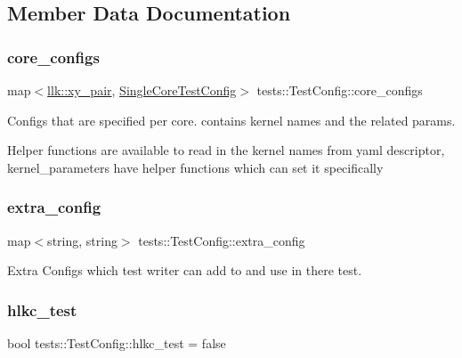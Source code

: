 \subsection{Member Data Documentation}
\mbox{\label{structtests_1_1TestConfig_ae5193ec96cb529d0e40360c46e4b6b42}} 
\subsubsection{\texorpdfstring{core\+\_\+configs}{core\_configs}}
{\footnotesize\ttfamily map$<$\hyperlink{structllk_1_1xy__pair}{llk\+::xy\+\_\+pair}, \hyperlink{structtests_1_1SingleCoreTestConfig}{Single\+Core\+Test\+Config}$>$ tests\+::\+Test\+Config\+::core\+\_\+configs}



Configs that are specified per core. contains kernel names and the related params. 

Helper functions are available to read in the kernel names from yaml descriptor, kernel\+\_\+parameters have helper functions which can set it specifically \mbox{\label{structtests_1_1TestConfig_ac2374c533a372b8f7183de6215fe9791}} 
\subsubsection{\texorpdfstring{extra\+\_\+config}{extra\_config}}
{\footnotesize\ttfamily map$<$string, string$>$ tests\+::\+Test\+Config\+::extra\+\_\+config}



Extra Configs which test writer can add to and use in there test. 

\mbox{\label{structtests_1_1TestConfig_ad3c14921521c690e03ab5664a69d9efc}} 
\subsubsection{\texorpdfstring{hlkc\+\_\+test}{hlkc\_test}}
{\footnotesize\ttfamily bool tests\+::\+Test\+Config\+::hlkc\+\_\+test = false}

